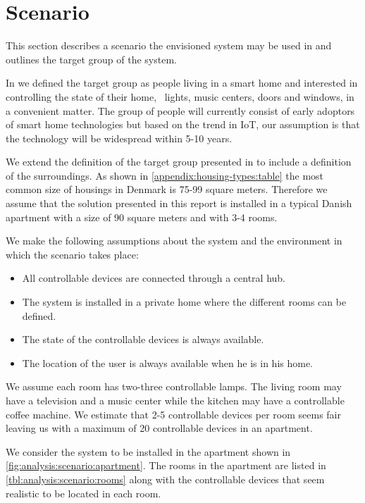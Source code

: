 \section{Scenario}
\label{sec:analysis:scenarios}

This section describes a scenario the envisioned system may be used in and outlines the target group of the system.

In \cite[p. 15]{prespecialisation} we defined the target group as people living in a smart home and interested in controlling the state of their home, \eg~lights, music centers, doors and windows, in a convenient matter. The group of people will currently consist of early adoptors of smart home technologies but based on the trend in IoT, our assumption is that the technology will be widespread within 5-10 years. 

We extend the definition of the target group presented in \cite[p. 15]{prespecialisation} to include a definition of the surroundings. As shown in \cref{appendix:housing-types:table} the most common size of housings in Denmark is 75-99 square meters. Therefore we assume that the solution presented in this report is installed in a typical Danish apartment with a size of 90 square meters and with 3-4 rooms. 

We make the following assumptions about the system and the environment in which the scenario takes place:

\begin{itemize}
    \item All controllable devices are connected through a central hub.
    \item The system is installed in a private home where the different rooms can be defined.
    \item The state of the controllable devices is always available.
    \item The location of the user is always available when he is in his home.
\end{itemize}

We assume each room has two-three controllable lamps. The living room may have a television and a music center while the kitchen may have a controllable coffee machine. We estimate that 2-5 controllable devices per room seems fair leaving us with a maximum of 20 controllable devices in an apartment.

We consider the system to be installed in the apartment shown in \cref{fig:analysis:scenario:apartment}. The rooms in the apartment are listed in \cref{tbl:analysis:scenario:rooms} along with the controllable devices that seem realistic to be located in each room.

